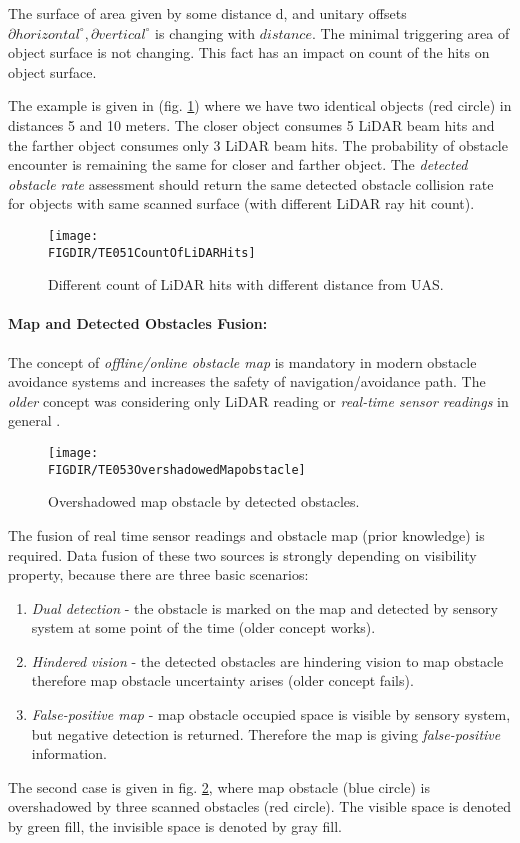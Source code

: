 The surface of area given by some distance d, and unitary offsets$\partial horizontal^\circ, \partial vertical^\circ$  is changing with $distance$. The minimal triggering area of object surface is not changing. This fact has an impact on count of the hits on object surface. 

The example is given in (fig. \ref{fig:P01CountOfLiDARHits}) where we have two identical objects (red circle) in distances 5 and 10 meters. The closer object consumes 5 LiDAR beam hits and the farther object consumes only 3 LiDAR beam hits. The probability of obstacle encounter is remaining the same for closer and farther object. The \emph{detected obstacle rate} assessment should return the same  detected obstacle collision rate for objects with same scanned surface (with different LiDAR ray hit count).

\begin{figure}[H]
    \centering
    \texttt{[image: \\FIGDIR/TE051CountOfLiDARHits]}
    \caption{Different count of LiDAR hits with different distance from UAS.}
    \label{fig:P01CountOfLiDARHits}
\end{figure}


\paragraph{Map and Detected Obstacles Fusion:} The concept of \emph{offline/online obstacle map} is mandatory in modern obstacle avoidance systems and increases the safety of navigation/avoidance path. The \emph{older} concept was considering only LiDAR reading or \emph{real-time sensor readings} in general \cite{gomola2017probabilistic}. 

\begin{figure}[htbp]
    \centering
    \texttt{[image: \\FIGDIR/TE053OvershadowedMapobstacle]}
    \caption{Overshadowed map obstacle by detected obstacles.}
    \label{fig:P02OvershadowedMapobstacle}
\end{figure}

\noindent The fusion of real time sensor readings and obstacle map (prior knowledge) is required. Data fusion of these two sources is strongly depending on visibility property, because there are three basic scenarios:

\begin{enumerate}
    \item \emph{Dual detection} - the obstacle is marked on the map and detected by sensory system at some point of the time (older concept works).
    
    \item \emph{Hindered vision} - the detected obstacles are hindering vision to map obstacle therefore map obstacle uncertainty arises (older concept fails). 
    
    \item \emph{False-positive map} - map obstacle occupied space is visible by sensory system, but negative detection is returned. Therefore the map is giving \emph{false-positive} information.
\end{enumerate}

\noindent The second case is given in fig. \ref{fig:P02OvershadowedMapobstacle}, where map obstacle (blue circle) is overshadowed by three scanned obstacles (red circle). The visible space is denoted by green fill, the invisible space is denoted by gray fill. 